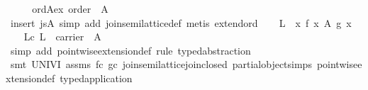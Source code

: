 \begin{isabellebody}
%
\isadelimproof
%
\endisadelimproof
%
\isatagproof
{}\isamarkupfalse%
\ {}\isanewline
\ \ \isamarkupfalse%
\ ord{}A{}ex{}\ {}order\ {}{}\ A{}{}\isanewline
\ \ \ \ \isamarkupfalse%
\ {}insert\ js{}A{}\ simp\ add{}\ join{}semilattice{}def{}\ metis\ extend{}ord{}\isanewline
\isanewline
\ \ \isamarkupfalse%
\ {}L\ {}\ {}{}x{}\ f\ x\ {}\isactrlbsub A\isactrlesub \ g\ x{}\isanewline
\ \ \isamarkupfalse%
\ Lc{}\ {}{}L\ {}\ carrier\ {}{}\ A{}{}\isanewline
\ \ \ \ \isamarkupfalse%
\ {}simp\ add{}\ pointwise{}extension{}def{}\ rule\ typed{}abstraction{}\isanewline
\ \ \ \ \isamarkupfalse%
\ {}smt\ UNIV{}I\ assms\ fc\ gc\ join{}semilattice{}join{}closed\ partial{}object{}simps{}{}{}\ pointwise{}extension{}def\ typed{}application{}\isanewline

\end{isabellebody}

